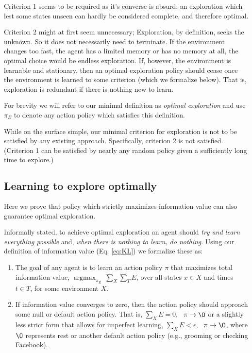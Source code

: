 \documentclass[9pt,twocolumn,twoside]{pnas-new}
\DeclareMathOperator*{\argmax}{argmax}
\begin{document}
Criterion 1 seems to be required as it's converse is absurd: an exploration which lest some states unseen can hardly be considered complete, and therefore optimal.

Criterion 2 might at first seem unnecessary; Exploration, by definition, seeks the unknown. So it does not necessarily need to terminate. If the environment changes too fast, the agent has a limited memory or has no memory at all, the optimal choice would be endless exploration. If, however, the environment is learnable and stationary, then an optimal exploration policy should cease once the environment is learned to some criterion (which we formalize below). That is, exploration is redundant if there is nothing new to learn.

For brevity we will refer to our minimal definition as \textit{optimal exploration} and use $\pi_E$ to denote any action policy which satisfies this definition.

While on the surface simple, our minimal criterion for exploration is not  to be satisfied by any existing approach. Specifically, criterion 2 is not satisfied. (Criterion 1 can be satisfied by nearly any random policy given a sufficiently long time to explore.) %


\subsection*{Learning to explore optimally} \label{sec:Obj1a}
Here we prove that policy which strictly maximizes information value can also guarantee optimal exploration. 

Informally stated, to achieve optimal exploration an agent should \textit{try and learn everything possible} and, \textit{when there is nothing to learn, do nothing}. Using our definition of information value (Eq. \ref{eq:KL}) we formalize these as:

\begin{enumerate}[noitemsep,wide=0pt,leftmargin=\dimexpr\labelwidth+2\labelsep\relax]
    \item The goal of any agent is to learn an action policy $\pi$ that maximizes total information value, $\argmax_{\pi_E} \ \sum_X \sum_T E$, over all states $x \in X$ and times $t \in T$, for some environment $X$.
    \item If information value converges to zero, then the action policy should approach some null or default action policy. That is, $\sum_X E = 0$, \ $\pi \rightarrow \O$ or a slightly less strict form that allows for imperfect learning, $\sum_X E < \epsilon $, \ $\pi \rightarrow \O$, where $\O$ represents rest or another default action policy (e.g., grooming or checking Facebook).
\end{enumerate}
\end{document}
